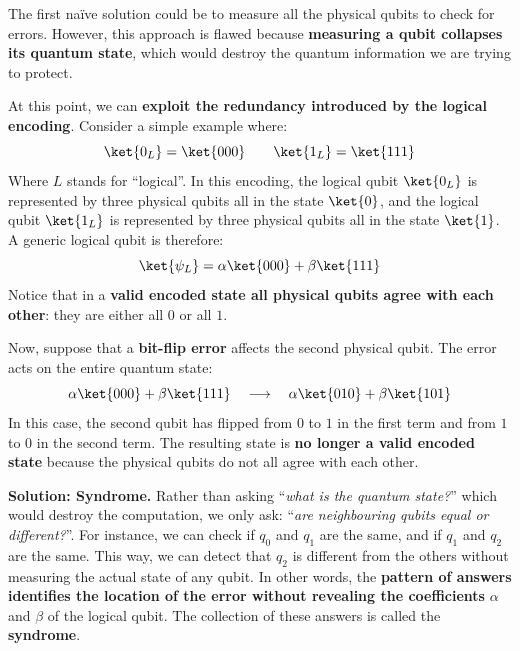 \highspace
\textcolor{Red2}{} The first naïve solution could be to measure all the physical qubits to check for errors. However, this approach is flawed because \textbf{measuring a qubit collapses its quantum state}, which would destroy the quantum information we are trying to protect.

\highspace
At this point, we can \textbf{exploit the redundancy introduced by the logical encoding}. Consider a simple example where:
\begin{equation*}
    \ket{0_L} = \ket{000}
    \qquad
    \ket{1_L} = \ket{111}
\end{equation*}
Where $L$ stands for ``logical''. In this encoding, the logical qubit $\ket{0_L}$ is represented by three physical qubits all in the state $\ket{0}$, and the logical qubit $\ket{1_L}$ is represented by three physical qubits all in the state $\ket{1}$.
A generic logical qubit is therefore:
\begin{equation*}
    \ket{\psi_L}
    =
    \alpha\ket{000}
    +
    \beta\ket{111}
\end{equation*}
Notice that in a \textbf{valid encoded state all physical qubits agree with each other}: they are either all $0$ or all $1$.

\highspace
Now, suppose that a \textbf{bit-flip error} affects the second physical qubit. The error acts on the entire quantum state:
\begin{equation*}
    \alpha\ket{000}
    +
    \beta\ket{111}
    \quad\longrightarrow\quad
    \alpha\ket{010}
    +
    \beta\ket{101}
\end{equation*}
In this case, the second qubit has flipped from $0$ to $1$ in the first term and from $1$ to $0$ in the second term. The resulting state is \textbf{no longer a valid encoded state} because the physical qubits do not all agree with each other.

\highspace
\textcolor{Green3}{ \textbf{Solution: Syndrome.}} Rather than asking ``\emph{what is the quantum state?}'' which would destroy the computation, we only ask: ``\emph{are neighbouring qubits equal or different?}''. For instance, we can check if $q_0$ and $q_1$ are the same, and if $q_1$ and $q_2$ are the same. This way, we can detect that $q_2$ is different from the others without measuring the actual state of any qubit. In other words, the \textbf{pattern of answers identifies the location of the error without revealing the coefficients} $\alpha$ and $\beta$ of the logical qubit. The collection of these answers is called the \textbf{syndrome}.


